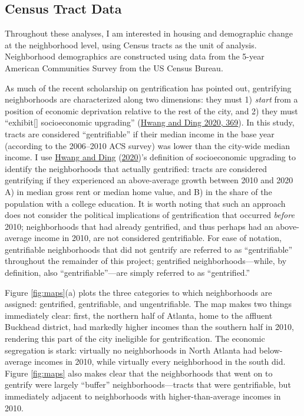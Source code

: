 \documentclass[
  12pt,
]{article}
\begin{document}
\hypertarget{census-tract-data}{%
\subsection{Census Tract Data}\label{census-tract-data}}

Throughout these analyses, I am interested in housing and demographic change at the neighborhood level, using Census tracts as the unit of analysis. Neighborhood demographics are constructed using data from the 5-year American Communities Survey from the US Census Bureau.

As much of the recent scholarship on gentrification has pointed out, gentrifying neighborhoods are characterized along two dimensions: they must 1) \emph{start} from a position of economic deprivation relative to the rest of the city, and 2) they must ``exhibit{[}{]} socioeconomic upgrading'' (\protect\hyperlink{ref-Hwang2020}{Hwang and Ding 2020, 369}). In this study, tracts are considered ``gentrifiable'' if their median income in the base year (according to the 2006--2010 ACS survey) was lower than the city-wide median income. I use \protect\hyperlink{ref-Hwang2020}{Hwang and Ding} (\protect\hyperlink{ref-Hwang2020}{2020})'s definition of socioeconomic upgrading to identify the neighborhoods that actually gentrified: tracts are considered gentrifying if they experienced an above-average growth between 2010 and 2020 A) in median gross rent or median home value, and B) in the share of the population with a college education. It is worth noting that such an approach does not consider the political implications of gentrification that occurred \emph{before} 2010; neighborhoods that had already gentrified, and thus perhaps had an above-average income in 2010, are not considered gentrifiable. For ease of notation, gentrifiable neighborhoods that did not gentrify are referred to as ``gentrifiable'' throughout the remainder of this project; gentrified neighborhoods---while, by definition, also ``gentrifiable''---are simply referred to as ``gentrified.''

Figure \ref{fig:maps}(a) plots the three categories to which neighborhoods are assigned: gentrified, gentrifiable, and ungentrifiable. The map makes two things immediately clear: first, the northern half of Atlanta, home to the affluent Buckhead district, had markedly higher incomes than the southern half in 2010, rendering this part of the city ineligible for gentrification. The economic segregation is stark: virtually no neighborhoods in North Atlanta had below-average incomes in 2010, while virtually every neighborhood in the south did. Figure \ref{fig:maps} also makes clear that the neighborhoods that went on to gentrify were largely ``buffer'' neighborhoods---tracts that were gentrifiable, but immediately adjacent to neighborhoods with higher-than-average incomes in 2010.
\end{document}
